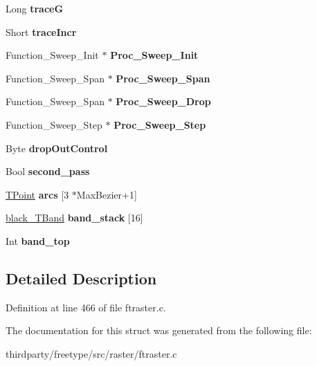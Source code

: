 \begin{DoxyCompactItemize}
Long {\bfseries traceG}
\item 
\mbox{\label{structblack___t_worker___a4c01e6a111f8187a94cb486b542c5f9f}} 
Short {\bfseries trace\+Incr}
\item 
\mbox{\label{structblack___t_worker___a404908f97b339a4e3f9c0b72b146880f}} 
Function\+\_\+\+Sweep\+\_\+\+Init $\ast$ {\bfseries Proc\+\_\+\+Sweep\+\_\+\+Init}
\item 
\mbox{\label{structblack___t_worker___aa964c50e1bd073289d47b52606f35c93}} 
Function\+\_\+\+Sweep\+\_\+\+Span $\ast$ {\bfseries Proc\+\_\+\+Sweep\+\_\+\+Span}
\item 
\mbox{\label{structblack___t_worker___a3486eedb9b40b3fafc83b0b572ac4cd1}} 
Function\+\_\+\+Sweep\+\_\+\+Span $\ast$ {\bfseries Proc\+\_\+\+Sweep\+\_\+\+Drop}
\item 
\mbox{\label{structblack___t_worker___a45269819a967d5188d56b988bd610ee7}} 
Function\+\_\+\+Sweep\+\_\+\+Step $\ast$ {\bfseries Proc\+\_\+\+Sweep\+\_\+\+Step}
\item 
\mbox{\label{structblack___t_worker___a5a4ec492a5a23a9dd903c0ac1f682356}} 
Byte {\bfseries drop\+Out\+Control}
\item 
\mbox{\label{structblack___t_worker___abded870cdd2c1a8b8ea06da788e51090}} 
Bool {\bfseries second\+\_\+pass}
\item 
\mbox{\label{structblack___t_worker___aae219cc82af4d41e25d7d76497f03f3b}} 
\hyperlink{struct_t_point__}{T\+Point} {\bfseries arcs} \mbox{[}3 $\ast$Max\+Bezier+1\mbox{]}
\item 
\mbox{\label{structblack___t_worker___a6c19dd30e12019590354c4dd88544ebb}} 
\hyperlink{structblack___t_band__}{black\+\_\+\+T\+Band} {\bfseries band\+\_\+stack} \mbox{[}16\mbox{]}
\item 
\mbox{\label{structblack___t_worker___aac3918890430137cf8464dd7ff7ad756}} 
Int {\bfseries band\+\_\+top}
\end{DoxyCompactItemize}


\subsection{Detailed Description}


Definition at line 466 of file ftraster.\+c.



The documentation for this struct was generated from the following file\+:\begin{DoxyCompactItemize}
\item 
thirdparty/freetype/src/raster/ftraster.\+c\end{DoxyCompactItemize}
